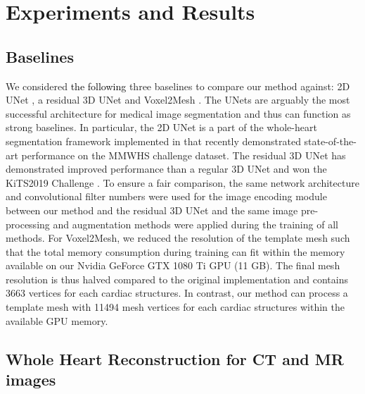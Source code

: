 \documentclass[times,review,preprint,authoryear]{elsarticle}
\begin{document}
\section{Experiments and Results}
\subsection{Baselines}
We considered \textcolor{black}{the following} three baselines to compare our method against: 2D UNet \citep{Ronneberger2015}, a residual 3D UNet \citep{Isensee2017} and Voxel2Mesh \citep{Voxel2Mesh}. The UNets are arguably the most successful architecture for medical image segmentation and thus can function as strong baselines. In particular, the 2D UNet is a part of the whole-heart segmentation framework implemented in \cite{KONG2020} that recently demonstrated state-of-the-art performance on the MMWHS challenge dataset. The residual 3D UNet has demonstrated improved performance than a regular 3D UNet and won the KiTS2019 Challenge \citep{Isensee2019AnAA, HELLER2021101821}. To ensure a fair comparison, the same network architecture and convolutional filter numbers were used for the image encoding module between our method and the residual 3D UNet and the same image pre-processing and augmentation methods were applied during the training of all methods. For Voxel2Mesh, we reduced the resolution of the template mesh such that the total memory consumption during training can fit within the memory available on our Nvidia GeForce GTX 1080 Ti GPU (11 GB). The final mesh resolution is thus halved compared to the original implementation \citep{Voxel2Mesh} and contains 3663 vertices for each cardiac structures. In contrast, our method can process a template mesh with 11494 mesh vertices for each cardiac structures within the available GPU memory.

\subsection{Whole Heart Reconstruction for CT and MR images}
\end{document}
